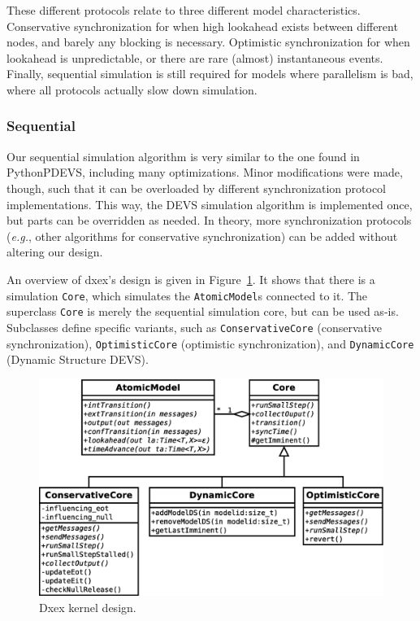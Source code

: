 These different protocols relate to three different model characteristics.
Conservative synchronization for when high lookahead exists between different nodes, and barely any blocking is necessary.
Optimistic synchronization for when lookahead is unpredictable, or there are rare (almost) instantaneous events.
Finally, sequential simulation is still required for models where parallelism is bad, where all protocols actually slow down simulation.

\subsubsection{Sequential}
Our sequential simulation algorithm is very similar to the one found in PythonPDEVS, including many optimizations.
Minor modifications were made, though, such that it can be overloaded by different synchronization protocol implementations.
This way, the \textsf{DEVS} simulation algorithm is implemented once, but parts can be overridden as needed.
In theory, more synchronization protocols (\textit{e.g.}, other algorithms for conservative synchronization) can be added without altering our design.

An overview of dxex's design is given in Figure~\ref{fig:class_diagram}.
It shows that there is a simulation \texttt{Core}, which simulates the \texttt{AtomicModel}s connected to it.
The superclass \texttt{Core} is merely the sequential simulation core, but can be used as-is.
Subclasses define specific variants, such as \texttt{ConservativeCore} (conservative synchronization), \texttt{OptimisticCore} (optimistic synchronization), and \texttt{DynamicCore} (\textsf{Dynamic Structure DEVS}).

\begin{figure}
    \includegraphics[width=\columnwidth]{fig/cores_class_diagram.eps}
	\caption{Dxex kernel design.}
	\label{fig:class_diagram}
\end{figure}

